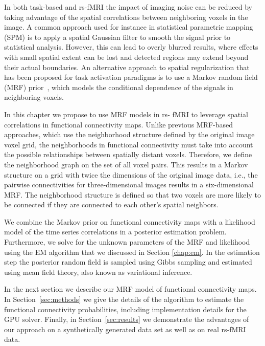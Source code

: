In both task-based and rs-fMRI the impact of imaging noise can be reduced by
taking advantage of the spatial correlations between neighboring voxels in the
image. A common approach used for instance in statistical parametric mapping
(SPM)\cite{worsley_analysis_1995} is to apply a spatial Gaussian filter to
smooth the signal prior to statistical analysis. However, this can lead to
overly blurred results, where effects with small spatial extent can be lost and
detected regions may extend beyond their actual boundaries. An alternative
approach to spatial regularization that has been proposed for task activation
paradigms is to use a Markov random field (MRF) prior~\cite{ou_spatial_2005,
  descombes_spatio-temporal_1998, descombes_fmri_1998,
  woolrich_fully_2004,cosman_exact_2004}, which models the conditional
dependence of the signals in neighboring voxels.

In this chapter we propose to use MRF models in rs- fMRI to leverage spatial
correlations in functional connectivity maps. Unlike previous MRF-based
approaches, which use the neighborhood structure defined by the original image
voxel grid, the neighborhoods in functional connectivity must take into account
the possible relationships between spatially distant voxels. Therefore, we
define the neighborhood graph on the set of all voxel pairs. This results in a
Markov structure on a grid with twice the dimensions of the original image data,
i.e., the pairwise connectivities for three-dimensional images results in a
six-dimensional MRF. The neighborhood structure is defined so that two voxels
are more likely to be connected if they are connected to each other's spatial
neighbors.

We combine the Markov prior on functional connectivity maps with a likelihood
model of the time series correlations in a posterior estimation problem.
Furthermore, we  solve for the unknown parameters of the MRF and likelihood
using the EM algorithm that we discussed in Section \ref{chap:em}. In the
estimation step the posterior random field is sampled using Gibbs sampling and
estimated using mean field theory, also known as variational inference.

In the next section we describe our MRF model of functional connectivity maps.
In Section~\ref{sec:methods} we give the details of the algorithm to estimate
the functional connectivity probabilities, including implementation details for
the GPU solver. Finally, in Section~\ref{sec:results} we demonstrate the
advantages of our approach on a synthetically generated data set as well as on
real rs-fMRI data.


